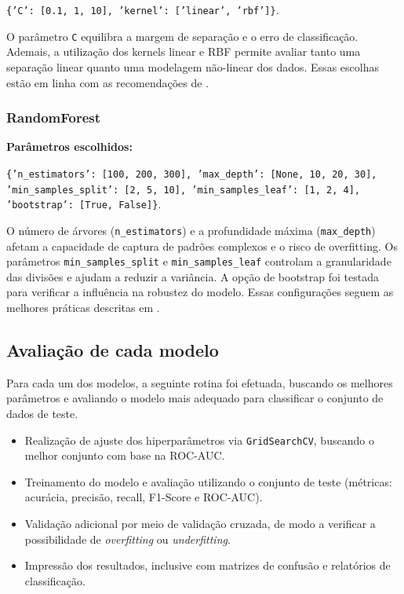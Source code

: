 \documentclass[conference]{IEEEtran}
\begin{document}
\texttt{\{'C': [0.1, 1, 10], 'kernel': ['linear', 'rbf']\}}.  

O parâmetro \texttt{C} equilibra a margem de separação e o erro de classificação. Ademais, a utilização dos kernels linear e RBF permite avaliar tanto uma separação linear quanto uma modelagem não-linear dos dados. Essas escolhas estão em linha com as recomendações de \cite{ref:svm}.

\subsubsection{RandomForest}
\textbf{Parâmetros escolhidos:} 

    \texttt{\{'n\_estimators': [100, 200, 300], 'max\_depth': [None, 10, 20, 30], 'min\_samples\_split': [2, 5, 10], 'min\_samples\_leaf': [1, 2, 4], 'bootstrap': [True, False]\}}.  
 
O número de árvores (\texttt{n\_estimators}) e a profundidade máxima (\texttt{max\_depth}) afetam a capacidade de captura de padrões complexos e o risco de overfitting. Os parâmetros \texttt{min\_samples\_split} e \texttt{min\_samples\_leaf} controlam a granularidade das divisões e ajudam a reduzir a variância. A opção de bootstrap foi testada para verificar a influência na robustez do modelo. Essas configurações seguem as melhores práticas descritas em \cite{ref:rf}.

\subsection{Avaliação de cada modelo}
    Para cada um dos modelos, a seguinte rotina foi efetuada, buscando os melhores parâmetros e avaliando o modelo mais adequado para classificar o conjunto de dados de teste.
    \begin{itemize}
        \item Realização de ajuste dos hiperparâmetros via \texttt{GridSearchCV}, buscando o melhor conjunto com base na ROC-AUC.
        \item Treinamento do modelo e avaliação utilizando o conjunto de teste (métricas: acurácia, precisão, recall, F1-Score e ROC-AUC).
        \item Validação adicional por meio de validação cruzada, de modo a verificar a possibilidade de \emph{overfitting} ou \emph{underfitting}.
        \item Impressão dos resultados, inclusive com matrizes de confusão e relatórios de classificação.
    \end{itemize}
\end{document}
